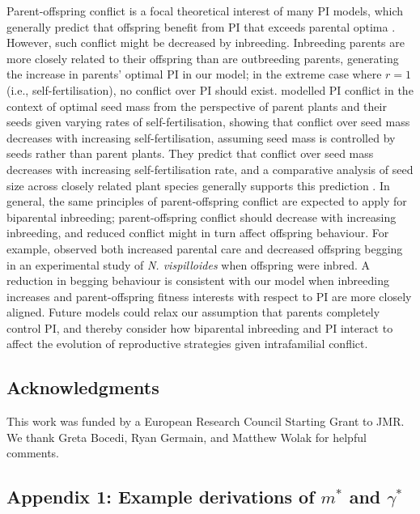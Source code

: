 \documentclass[10pt,letterpaper]{article}
\begin{document}
Parent-offspring conflict is a focal theoretical interest of many PI models, which generally predict that offspring benefit from PI that exceeds parental optima \cite[][]{Macnair1978, Parker1978, Parker1985, DeJong2005}. However, such conflict might be decreased by inbreeding. Inbreeding parents are more closely related to their offspring than are outbreeding parents, generating the increase in parents' optimal PI in our model; in the extreme case where $r=1$ (i.e., self-fertilisation), no conflict over PI should exist. \cite{DeJong2005} modelled PI conflict in the context of optimal seed mass from the perspective of parent plants and their seeds given varying rates of self-fertilisation, showing that conflict over seed mass decreases with increasing self-fertilisation, assuming seed mass is controlled by seeds rather than parent plants. They predict that conflict over seed mass decreases with increasing self-fertilisation rate, and a comparative analysis of seed size across closely related plant species generally supports this prediction \cite[][]{DeJong2005}. In general, the same principles of parent-offspring conflict are expected to apply for biparental inbreeding; parent-offspring conflict should decrease with increasing inbreeding, and reduced conflict might in turn affect offspring behaviour. For example, \cite{Mattey2014} observed both increased parental care and decreased offspring begging in an experimental study of \textit{N. vispilloides} when offspring were inbred. A reduction in begging behaviour is consistent with our model when inbreeding increases and parent-offspring fitness interests with respect to PI are more closely aligned. Future models could relax our assumption that parents completely control PI, and thereby consider how biparental inbreeding and PI interact to affect the evolution of reproductive strategies given intrafamilial conflict.

\subsection*{Acknowledgments}

This work was funded by a European Research Council Starting Grant to JMR. We thank Greta Bocedi, Ryan Germain, and Matthew Wolak for helpful comments.

\subsection*{Appendix 1: Example derivations of $m^{*}$ and $\gamma^{*}$}
\end{document}
